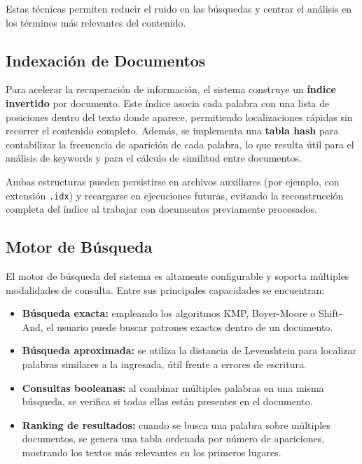 \documentclass[9pt,letterpaper,onecolumn]{rho-class/rho}
\begin{document}
Estas técnicas permiten reducir el ruido en las búsquedas y centrar el análisis en los términos más relevantes del contenido.

\subsection{Indexación de Documentos}

Para acelerar la recuperación de información, el sistema construye un \textbf{índice invertido} por documento. Este índice asocia cada palabra con una lista de posiciones dentro del texto donde aparece, permitiendo localizaciones rápidas sin recorrer el contenido completo. Además, se implementa una \textbf{tabla hash} para contabilizar la frecuencia de aparición de cada palabra, lo que resulta útil para el análisis de keywords y para el cálculo de similitud entre documentos.

Ambas estructuras pueden persistirse en archivos auxiliares (por ejemplo, con extensión \texttt{.idx}) y recargarse en ejecuciones futuras, evitando la reconstrucción completa del índice al trabajar con documentos previamente procesados.


\subsection{Motor de Búsqueda}

El motor de búsqueda del sistema es altamente configurable y soporta múltiples modalidades de consulta. Entre sus principales capacidades se encuentran:

\begin{itemize}
    \item \textbf{Búsqueda exacta:} empleando los algoritmos KMP, Boyer-Moore o Shift-And, el usuario puede buscar patrones exactos dentro de un documento.
    \item \textbf{Búsqueda aproximada:} se utiliza la distancia de Levenshtein para localizar palabras similares a la ingresada, útil frente a errores de escritura.
    \item \textbf{Consultas booleanas:} al combinar múltiples palabras en una misma búsqueda, se verifica si todas ellas están presentes en el documento.
    \item \textbf{Ranking de resultados:} cuando se busca una palabra sobre múltiples documentos, se genera una tabla ordenada por número de apariciones, mostrando los textos más relevantes en los primeros lugares.
\end{itemize}
\end{document}
